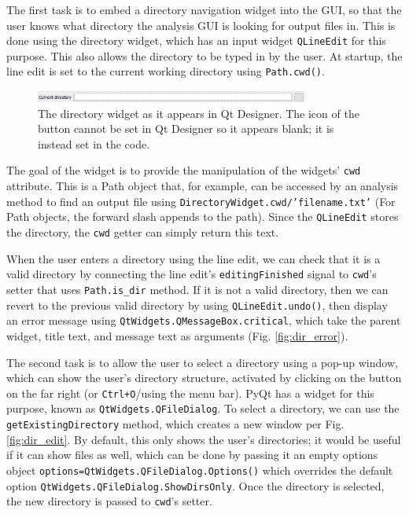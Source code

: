 \documentclass[12pt]{article}
\begin{document}
The first task is to embed a directory navigation widget into the GUI, so that the user knows what directory the analysis GUI is looking for output files in. This is done using the directory widget, which has an input widget \texttt{QLineEdit} for this purpose. This also allows the directory to be typed in by the user. At startup, the line edit is set to the current working directory using \texttt{Path.cwd()}.

\begin{figure}[h]
    \centering
    \includegraphics[width=0.8\textwidth]{img/dir_widget.png}
    \caption{The directory widget as it appears in Qt Designer. The icon of the button cannot be set in Qt Designer so it appears blank; it is instead set in the code.}
    \label{fig:dir_widget}
\end{figure}

The goal of the widget is to provide the manipulation of the widgets' \texttt{cwd} attribute. This is a Path object that, for example, can be accessed by an analysis method to find an output file using \texttt{DirectoryWidget.cwd/'filename.txt'} (For Path objects, the forward slash appends to the path). Since the \texttt{QLineEdit} stores the directory, the \texttt{cwd} getter can simply return this text.

When the user enters a directory using the line edit, we can check that it is a valid directory by connecting the line edit's \texttt{editingFinished} signal to \texttt{cwd}'s setter that uses \texttt{Path.is\_dir} method. If it is not a valid directory, then we can revert to the previous valid directory by using \texttt{QLineEdit.undo()}, then display an error message using \texttt{QtWidgets.QMessageBox.critical}, which take the parent widget, title text, and message text as arguments (Fig. \ref{fig:dir_error}).

The second task is to allow the user to select a directory using a pop-up window, which can show the user's directory structure, activated by clicking on the button on the far right (or \texttt{Ctrl+O}/using the menu bar). PyQt has a widget for this purpose, known as \texttt{QtWidgets.QFileDialog}. To select a directory, we can use the \texttt{getExistingDirectory} method, which creates a new window per Fig. \ref{fig:dir_edit}. By default, this only shows the user's directories; it would be useful if it can show files as well, which can be done by passing it an empty options object \texttt{options=QtWidgets.QFileDialog.Options()} which overrides the default option \texttt{QtWidgets.QFileDialog.ShowDirsOnly}. Once the directory is selected, the new directory is passed to \texttt{cwd}'s setter.
\end{document}
